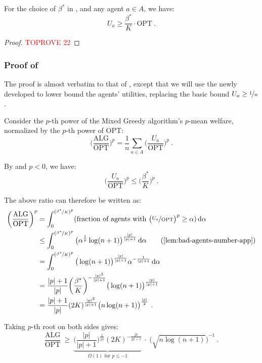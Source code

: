 \documentclass[11pt,letterpaper]{article}
\newcommand{\OPT}{\mathrm{OPT}}
\newcommand{\ALG}{\mathrm{ALG}}
\newcommand{\dif}[1]{\,\text{\rm d} #1}
\newcommand{\utility}{U}
\begin{document}
\begin{lemma}
	\label{lem:negative-infinity-main-lemma-app}
	For the choice of $\beta^*$ in , and any agent $a \in A$, we have:
	\[
	\utility_a \ge \frac{\beta^*}{K} \cdot \OPT
	~.
	\]
\end{lemma}

\begin{proof}\textcolor{red}{TOPROVE 22}\end{proof}



\subsubsection{Proof of }

The proof is almost verbatim to that of , except that we will use the newly developed  to lower bound the agents' utilities, replacing the basic bound $\utility_a \ge \nicefrac{1}{n}$.

Consider the $p$-th power of the Mixed Greedy algorithm's $p$-mean welfare, normalized by the $p$-th power of $\OPT$:
\[
\bigg( \frac{\ALG}{\OPT} \bigg)^p = \frac{1}{n} \sum_{a\in A} \bigg( \frac{\utility_a}{\OPT} \bigg)^p
~.
\]

By  and $p < 0$, we have:
\[
\bigg(\frac{\utility_a}{\OPT}\bigg)^p \le \bigg(\frac{\beta^*}{K}\bigg)^p
~.
\]

The above ratio can therefore be written as:
\begin{align*}
	\bigg( \frac{\ALG}{\OPT} \bigg)^p
	& = \int_0^{(\nicefrac{\beta^*}{K})^p} (\text{fraction of agents with $\big( \nicefrac{\utility_a}{\OPT} \big)^p \ge \alpha$)} \dif{\alpha} \\
	&
	\le \int_0^{(\nicefrac{\beta^*}{K})^p} \big( \alpha^{\frac{1}{p}} \log(n+1) \big)^{\frac{|p|}{|p|+1}} \dif{\alpha} 
	\tag{\Cref{lem:bad-agents-number-app}} \\
	&
	= \int_0^{(\nicefrac{\beta^*}{K})^p} \big( \log(n+1) \big)^{\frac{|p|}{|p|+1}} \alpha^{-\frac{1}{|p|+1}} \dif{\alpha} \\
	&
	= \frac{|p|+1}{|p|} \bigg(\frac{\beta^*}{K}\bigg)^{-\frac{|p|^2}{|p|+1}} \big(\log(n+1) \big)^{\frac{|p|}{|p|+1}} \\
	&
	= \frac{|p|+1}{|p|} (2K)^{{\frac{|p|^2}{|p|+1}}} \big( n \log(n+1) \big)^{\frac{|p|}{2}}
	~.
\end{align*}

Taking $p$-th root on both sides gives:
\[
\frac{\ALG}{\OPT} ~\ge~ \underbrace{\bigg( \frac{|p|}{|p|+1} \bigg)^{\frac{1}{|p|}} (2K)^{-{\frac{|p|}{|p|+1}}}}_{\text{$\Omega(1)$ for $p \le -1$}} ~\cdot~ {\Big(\sqrt{n \log(n+1)}\Big)}^{-1}
~.
\]








 
\end{document}
